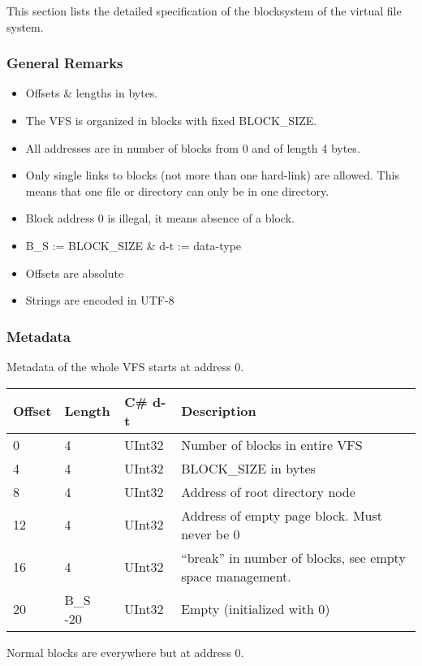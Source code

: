 \documentclass[a4paper,12pt]{article}
\begin{document}
This section lists the detailed specification of the blocksystem of the virtual file system.

\subsubsection{General Remarks}

\begin{itemize}
	\item Offsets \& lengths in bytes.
	\item The VFS is organized in blocks with fixed BLOCK\_SIZE.
	\item All addresses are in number of blocks from 0 and of length 4 bytes.
	\item Only single links to blocks (not more than one hard-link) are allowed. This means that one file or directory can only be in one directory.
	\item Block address 0 is illegal, it means absence of a block.
	\item B\_S := BLOCK\_SIZE \& d-t := data-type
	\item Offsets are absolute
	\item Strings are encoded in UTF-8
\end{itemize}

\subsubsection{Metadata}

Metadata of the whole VFS starts at address 0.\\

\begin{tabular}{|p{1.5cm}|p{1.5cm}|p{1.5cm}|p{7cm}|}\hline
Offset 	&Length	&C\# d-t	&Description\\\hline
0	&4	&UInt32	&Number of blocks in entire VFS\\
4	&4	&UInt32	&BLOCK\_SIZE in bytes\\
8	&4	&UInt32	&Address of root directory node\\
12	&4	&UInt32	&Address of empty page block. Must never be 0\\
16	&4	&UInt32	&“break” in number of blocks, see empty space management.\\
20	&B\_S -20	&UInt32	&Empty (initialized with 0)\\\hline
\end{tabular}

Normal blocks are everywhere but at address 0.
\end{document}
